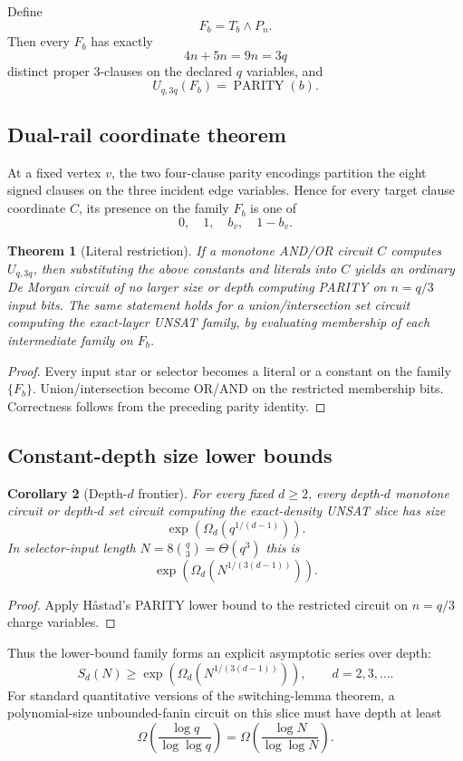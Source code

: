 \documentclass[11pt]{article}
\newtheorem{theorem}{Theorem}
\newtheorem{corollary}[theorem]{Corollary}
\begin{document}
Define
\[F_b=T_b\wedge P_n.\]
Then every $F_b$ has exactly
\[4n+5n=9n=3q\]
distinct proper 3-clauses on the declared $q$ variables, and
\[\boxed{U_{q,3q}(F_b)=\operatorname{PARITY}(b).}\]

\subsection{Dual-rail coordinate theorem}
At a fixed vertex $v$, the two four-clause parity encodings partition the eight signed clauses on the three incident edge variables. Hence for every target clause coordinate $C$, its presence on the family $F_b$ is one of
\[0,\quad1,\quad b_v,\quad1-b_v.\]

\begin{theorem}[Literal restriction]
If a monotone AND/OR circuit $C$ computes $U_{q,3q}$, then substituting the above constants and literals into $C$ yields an ordinary De Morgan circuit of no larger size or depth computing PARITY on $n=q/3$ input bits. The same statement holds for a union/intersection set circuit computing the exact-layer UNSAT family, by evaluating membership of each intermediate family on $F_b$.
\end{theorem}
\begin{proof}
Every input star or selector becomes a literal or a constant on the family $\{F_b\}$. Union/intersection become OR/AND on the restricted membership bits. Correctness follows from the preceding parity identity.
\end{proof}

\subsection{Constant-depth size lower bounds}
\begin{corollary}[Depth-$d$ frontier]
For every fixed $d\ge2$, every depth-$d$ monotone circuit or depth-$d$ set circuit computing the exact-density UNSAT slice has size
\[\boxed{\exp\!\left(\Omega_d(q^{1/(d-1)})\right).}\]
In selector-input length $N=8\binom q3=\Theta(q^3)$ this is
\[\boxed{\exp\!\left(\Omega_d(N^{1/(3(d-1))})\right).}\]
\end{corollary}
\begin{proof}
Apply H\aa stad's PARITY lower bound to the restricted circuit on $n=q/3$ charge variables.
\end{proof}

Thus the lower-bound family forms an explicit asymptotic series over depth:
\[S_d(N)\ge\exp\!\left(\Omega_d(N^{1/(3(d-1))})\right),\qquad d=2,3,\ldots.\]
For standard quantitative versions of the switching-lemma theorem, a polynomial-size unbounded-fanin circuit on this slice must have depth at least
\[\Omega\!\left(\frac{\log q}{\log\log q}\right)=\Omega\!\left(\frac{\log N}{\log\log N}\right).\]
\end{document}
